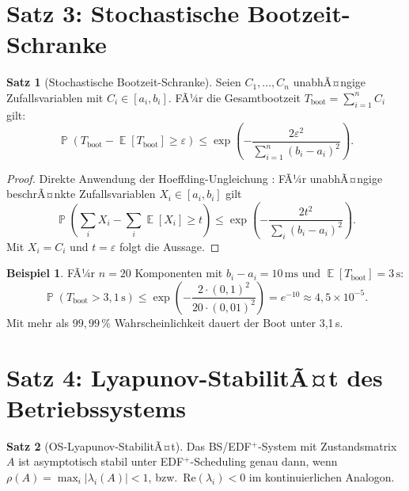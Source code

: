 ﻿\documentclass[a4paper,12pt]{scrreprt}
\theoremstyle{definition}
\newtheorem{satz}{Satz}[chapter]
\newtheorem{beispiel}{Beispiel}[chapter]
\DeclareMathOperator{\E}{\mathbb{E}}
\DeclareMathOperator{\Prob}{\mathbb{P}}
\begin{document}
	\section{Satz 3: Stochastische Bootzeit-Schranke}
	
	\begin{satz}[Stochastische Bootzeit-Schranke]\label{satz:boottime}
		Seien $C_1, \ldots, C_n$ unabhÃ¤ngige Zufallsvariablen mit
		$C_i \in [a_i, b_i]$. FÃ¼r die Gesamtbootzeit
		$T_{\mathrm{boot}} = \sum_{i=1}^n C_i$ gilt:
		\[
		\Prob\!\left(T_{\mathrm{boot}} - \E[T_{\mathrm{boot}}] \geq \varepsilon\right)
		\leq \exp\!\left(-\frac{2\varepsilon^2}{\sum_{i=1}^n (b_i - a_i)^2}\right).
		\]
	\end{satz}
	
	\begin{proof}
		Direkte Anwendung der Hoeffding-Ungleichung \cite{Hoeffding1963}:
		FÃ¼r unabhÃ¤ngige beschrÃ¤nkte Zufallsvariablen $X_i \in [a_i, b_i]$ gilt
		\[
		\Prob\!\left(\sum_i X_i - \sum_i \E[X_i] \geq t\right)
		\leq \exp\!\left(-\frac{2t^2}{\sum_i (b_i-a_i)^2}\right).
		\]
		Mit $X_i = C_i$ und $t = \varepsilon$ folgt die Aussage.
	\end{proof}
	
	\begin{beispiel}
		FÃ¼r $n = 20$ Komponenten mit $b_i - a_i = 10\,\text{ms}$ und
		$\E[T_{\mathrm{boot}}] = 3\,\text{s}$:
		\[
		\Prob(T_{\mathrm{boot}} > 3{,}1\,\text{s})
		\leq \exp\!\left(-\frac{2 \cdot (0{,}1)^2}{20 \cdot (0{,}01)^2}\right)
		= e^{-10} \approx 4{,}5 \times 10^{-5}.
		\]
		Mit mehr als $99{,}99\,\%$ Wahrscheinlichkeit dauert der Boot unter 3,1\,s.
	\end{beispiel}
	
	\section{Satz 4: Lyapunov-StabilitÃ¤t des Betriebssystems}
	
	\begin{satz}[OS-Lyapunov-StabilitÃ¤t]\label{satz:os_lyapunov}
		Das BS/EDF$^+$-System mit Zustandsmatrix $A$ ist asymptotisch
		stabil unter EDF$^+$-Scheduling genau dann, wenn
		$\rho(A) = \max_i |\lambda_i(A)| < 1$,
		bzw.\ $\mathrm{Re}(\lambda_i) < 0$ im kontinuierlichen Analogon.
	\end{satz}
	
\end{document}
